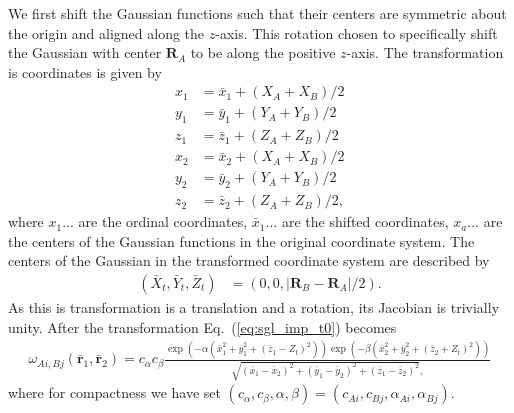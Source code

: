 \documentclass{revtex4}
\begin{document}
  We first shift the Gaussian functions such that their centers are symmetric about the origin and aligned along the $z$-axis.
  This rotation chosen to specifically shift the Gaussian with center $\mathbf{R}_A$ to be along the positive $z$-axis.
  The transformation is coordinates is given by
  \begin{align}
    x_1 &= \bar{x}_1 + (X_A + X_B)/2 \\
    y_1 &= \bar{y}_1 + (Y_A + Y_B)/2 \\
    z_1 &= \bar{z}_1 + (Z_A + Z_B)/2 \\
    x_2 &= \bar{x}_2 + (X_A + X_B)/2 \\
    y_2 &= \bar{y}_2 + (Y_A + Y_B)/2 \\
    z_2 &= \bar{z}_2 + (Z_A + Z_B)/2,
  \end{align}
  where $x_1...$ are the ordinal coordinates, $\bar{x}_1...$ are the shifted coordinates, $x_a...$ are the centers of the Gaussian functions in the original coordinate system.
  The centers of the Gaussian in the transformed coordinate system are described by
  \begin{align}
    (\bar{X}_t, \bar{Y}_t, \bar{Z}_t) &= (0, 0, |\mathbf{R}_B - \mathbf{R}_A| / 2).
  \end{align}
  As this is transformation is a translation and a rotation, its Jacobian is trivially unity.
  After the transformation Eq.\ (\ref{eq:sgl_imp_t0}) becomes
  \begin{align}
    \omega_{Ai,Bj}(\bar{\mathbf{r}}_1, \bar{\mathbf{r}}_2) = 
    c_{\alpha} c_{\beta}
    \frac{
      \exp(-\alpha(\bar{x}_1^2 + \bar{y}_1^2 + (\bar{z}_1 - Z_t)^2))
      \exp(-\beta(\bar{x}_2^2 + \bar{y}_2^2 + (\bar{z}_2 + Z_t)^2))
    }
    {
      \sqrt{(\bar{x}_1 - \bar{x}_2)^2 + (\bar{y}_1 - \bar{y}_2)^2 + (\bar{z}_1 - \bar{z}_2)^2},
    }
    \label{eq:sgl_imp_t1}
  \end{align}
  where for compactness we have set $(c_\alpha, c_\beta, \alpha, \beta) = (c_{Ai}, c_{Bj}, \alpha_{Ai}, \alpha_{Bj})$.

\end{document}
